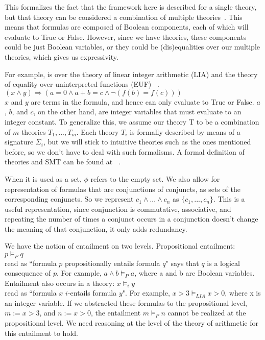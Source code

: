 \documentclass{article}
\begin{document}
This formalizes the fact that the framework here is 
described for a single theory, but that theory can 
be considered a combination of multiple 
theories~\cite{Manna2003}. This means that formulas are 
composed of Boolean components, each of which will 
evaluate to True or False. However, since 
we have theories, these components could be just Boolean 
variables, or they could be (dis)equalities over our 
multiple theories, which gives us expressivity. 

For example, is over the theory of linear integer 
arithmetic (LIA) and the theory of 
equality over uninterpreted functions (EUF)
~\cite{LIAEUF}.\\
$(x \land y) \Rightarrow (a = 0 \land a + b = c \land 
\neg (f(b) = f(c)))$ \\
$x$ and $y$ are terms in the 
formula, and hence can only evaluate to True or False.
$a$, $b$, and $c$, on the other hand, are integer variables 
that must evaluate to an integer constant. To generalize 
this, we assume our theory T to be a combination of $m$ 
theories $T_1, ..., T_m$. Each theory $T_i$ is formally 
described by means of a signature $\Sigma_i$, but we 
will stick to intuitive theories such as the ones mentioned 
before, so we don't have to deal with such formalisms. A 
formal definition of theories and SMT can be found at 
~\cite{DBLP:reference/mc/BarrettT18}.

When it is used as a set, $\phi$ refers to the empty set. We also allow for representation of formulas that are 
conjunctions of conjuncts, as sets of the corresponding 
conjuncts. So we represent $c_1 \land ... \land c_n$ as
$\{c_1, ..., c_n\}$. This is a useful representation, 
since conjunction is commutative, associative, and 
repeating the number of times a conjunct occurs in a 
conjunction doesn't change the meaning of that conjunction, 
it only adds redundancy.

We have the notion of entailment on two levels. Propositional 
entailment: \\
$p \models_P q$ \\
read as ``formula $p$ propositionally entails formula $q$" says 
that $q$ is a logical consequence of $p$. For example, 
$a \land b \models_P a$, where a and b are Boolean 
variables. Entailment also occurs in a theory:
$x \models_i y$ \\
read as ``formula $x$ $i$-entails formula $y$". For example, 
$x > 3 \models_{LIA} x > 0$, where x is an integer variable.
If we abstracted these formulas to the propositional level, 
$m := x > 3$, and $n := x > 0$, 
the entailment $m \models_P n$ cannot be realized at the 
propositional level. We need reasoning at the level of 
the theory of arithmetic for this entailment to hold.
\end{document}
